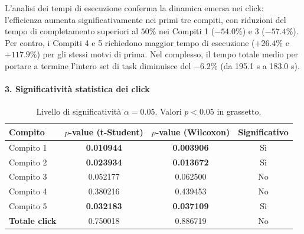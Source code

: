 \vspace{-2mm}
\noindent\small L'analisi dei tempi di esecuzione conferma la dinamica emersa nei click: l'efficienza  aumenta significativamente nei primi tre compiti, con riduzioni del tempo di completamento superiori al $50\%$ nei Compiti 1 ($-54.0\%$) e 3 ($-57.4\%$). Per contro, i Compiti 4 e 5 richiedono maggior tempo di esecuzione ($+26.4\%$ e $+117.9\%$) per gli stessi motvi di prima. Nel complesso, il tempo totale medio per portare a termine l'intero set di task diminuisce del $-6.2\%$ (da 195.1 s a 183.0 s).

\newpage
\paragraph{3. Significatività statistica dei click}\mbox{}\par\vspace{0.5ex}

\begin{table}[h!]
    \centering
    \small
    \begin{tabular}{lccc}
        \toprule
        \textbf{Compito} & \textbf{$p$-value (t-Student)} & \textbf{$p$-value (Wilcoxon)} & \textbf{Significativo} \\
        \midrule
        Compito 1 & \textbf{0.010944} & \textbf{0.003906} & Sì \\
        Compito 2 & \textbf{0.023934} & \textbf{0.013672} & Sì \\
        Compito 3 & 0.052177 & 0.062500 & No \\
        Compito 4 & 0.380216 & 0.439453 & No \\
        Compito 5 & \textbf{0.032183} & \textbf{0.037109} & Sì \\
        \midrule
        \textbf{Totale click} & 0.750018 & 0.886719 & No \\
        \bottomrule
    \end{tabular}
    \caption*{\small Livello di significatività $\alpha = 0.05$. Valori $p < 0.05$ in grassetto.}
\end{table}

